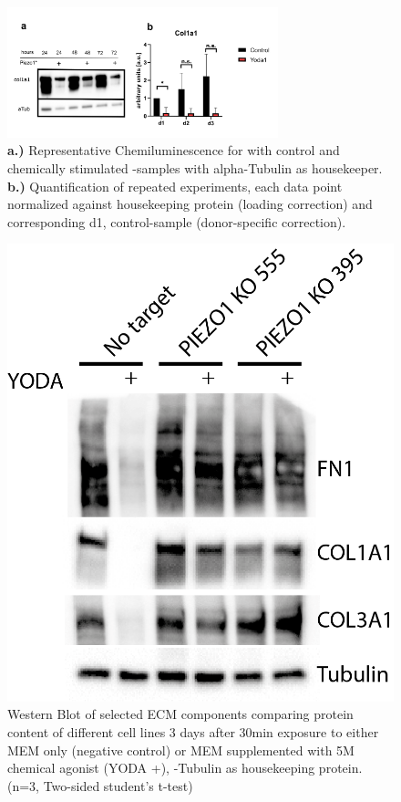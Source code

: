 \begin{figure}[htbp]
	\centering
	\includegraphics[width = 0.7\textwidth]{NormalYodaExp_WesternBlot_Col1a1.png}
	\caption{
		\textbf{a.)} Representative Chemiluminescence for \colone with control and chemically stimulated \Piezo{}-samples with alpha-Tubulin as housekeeper.
		\textbf{b.)} Quantification of repeated experiments, each data point normalized against housekeeping protein (loading correction) and corresponding d1, control-sample (donor-specific correction). }
	\label{fig:Yoda_Norm_WB}
\end{figure}

\begin{figure}
	\centering
	\includegraphics[width=0.7\linewidth]{Uli_Blot_KO.png}
	\caption{Western Blot of selected ECM components comparing protein content of different cell lines 3 days after 30min exposure to either MEM\textalpha{} only (negative control) or MEM\textalpha{} supplemented with 5\textmu{}M chemical \Piezo{} agonist (YODA +), \textalpha{}-Tubulin as housekeeping protein. (n=3, Two-sided student's t-test)
	}
	\label{pic:UliBlot}
\end{figure}

